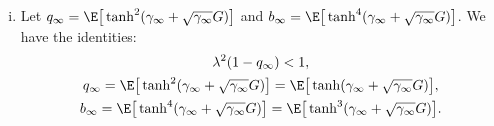 \documentclass[]{article}
\begin{document}
\begin{proposition}
\begin{enumerate}[(i)]
        \item %
        Let $q_\infty = \E\big[\tanh^2(\gamma_\infty + \sqrt{\gamma_\infty} G)\big]$
        and $b_\infty = \E\big[\tanh^4(\gamma_\infty + \sqrt{\gamma_\infty} G)\big]$.
        We have the identities:
        \begin{equation}
        \begin{gathered}
            \lambda^2(1- q_\infty) < 1,
            \\
            q_\infty = \E\big[\tanh^2(\gamma_\infty + \sqrt{\gamma_\infty}G)\big] = \E\big[\tanh(\gamma_\infty + \sqrt{\gamma_\infty}G)\big],
            \\
            b_\infty = \E\big[\tanh^4(\gamma_\infty + \sqrt{\gamma_\infty}G)\big] = \E\big[\tanh^3(\gamma_\infty + \sqrt{\gamma_\infty}G)\big].
        \end{gathered}
        \end{equation}


    \end{enumerate}

\end{proposition}
\end{document}
